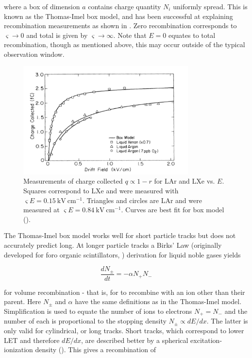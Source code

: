 \noindent where a box of dimension $a$ contains charge quantity $N_{i}$ uniformly spread.  This is known as the Thomas-Imel box model,
and has been successful at explaining recombination measurements as shown in .  Zero recombination corresponds to
$\varsigma \rightarrow 0$ and total is given by $\varsigma \rightarrow \infty$.  Note that $E = 0$ equates to total recombination, though
as mentioned above, this may occur outside of the typical observation window.

\begin{figure}
\includegraphics[width=0.8\textwidth]{TIRecombination}
\caption{Measurements of charge collected $q \propto 1 - r$ for LAr and LXe vs. $E$.  Squares correspond to LXe and were measured with
$\varsigma E = 0.15\ \mathrm{kV\ cm^{-1}}$.  Triangles and circles are LAr and were measured at
$\varsigma E = 0.84\ \mathrm{kV\ cm^{-1}}$.  Curves are best fit for box model ().}
\label{fig:ti_recomb}
\end{figure}

The Thomas-Imel box model works well for short particle tracks but does not accurately predict long.  At longer particle tracks a Birks'
Law (originally developed for foro organic scintillators, ) derivation for liquid noble gases yields

\begin{equation}
\frac{dN_{\pm}}{dt} = -\alpha N_{+} N_{-}
\label{eq:birks_diff}
\end{equation}

\noindent for volume recombination - that is, for \electron to recombine with an ion other than their parent.  Here $N_{\pm}$ and
$\alpha$ have the same definitions as in the Thomas-Imel model.  Simplification is used to equate the number of ions to electrons
$N_{+} = N_{-}$ and the number of each is proportional to the stopping density $N_{\pm} \propto dE/dx$.  The latter is only valid for
cylindrical, or long tracks.  Short tracks, which correspond to lower LET and therefore $dE/dx$, are described better by a spherical
excitation-ionization density ().  This gives a recombination of

